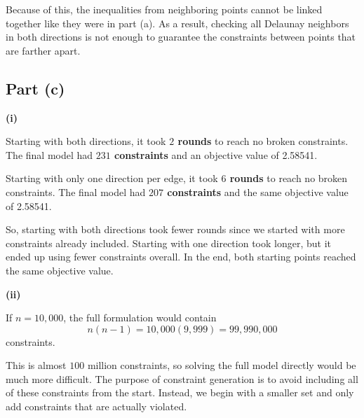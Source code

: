 \documentclass{article}
\begin{document}
Because of this, the inequalities from neighboring points cannot be
linked together like they were in part (a). As a result, checking all
Delaunay neighbors in both directions is not enough to guarantee the
constraints between points that are farther apart.


\vspace{5mm}

\subsection*{Part (c)}


\textbf{(i)}

Starting with both directions, it took \textbf{$2$ rounds} to reach no broken
constraints. The final model had \textbf{$231$ constraints} and an objective
value of 2.58541.

Starting with only one direction per edge, it took \textbf{$6$ rounds} to reach
no broken constraints. The final model had \textbf{$207$ constraints} and the
same objective value of 2.58541.


So, starting with both directions took fewer rounds since we started
with more constraints already included. Starting with one direction
took longer, but it ended up using fewer constraints overall. In the
end, both starting points reached the same objective value.


\vspace{5mm}
\textbf{(ii)}

If $n=10{,}000$, the full formulation would contain
\[
n(n-1)
=
10{,}000(9{,}999)
=
99{,}990{,}000
\]
constraints.

This is almost $100$ million constraints, so solving the full model
directly would be much more difficult. The purpose of constraint
generation is to avoid including all of these constraints from the
start. Instead, we begin with a smaller set and only add constraints
that are actually violated.
\end{document}
